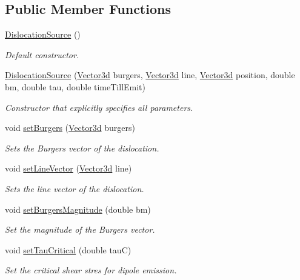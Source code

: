 \subsection*{\-Public \-Member \-Functions}
\begin{DoxyCompactItemize}
\item 
\hyperlink{classDislocationSource_afc9b7984d9486354b6f3d82033707577}{\-Dislocation\-Source} ()
\begin{DoxyCompactList}\small\item\em \-Default constructor. \end{DoxyCompactList}\item 
\hyperlink{classDislocationSource_a036a902d5e19a3f70371fa54f874d92e}{\-Dislocation\-Source} (\hyperlink{classVector3d}{\-Vector3d} burgers, \hyperlink{classVector3d}{\-Vector3d} line, \hyperlink{classVector3d}{\-Vector3d} position, double bm, double tau, double time\-Till\-Emit)
\begin{DoxyCompactList}\small\item\em \-Constructor that explicitly specifies all parameters. \end{DoxyCompactList}\item 
void \hyperlink{classDislocationSource_ae1a26d9f8149206b884436f44e92f4c3}{set\-Burgers} (\hyperlink{classVector3d}{\-Vector3d} burgers)
\begin{DoxyCompactList}\small\item\em \-Sets the \-Burgers vector of the dislocation. \end{DoxyCompactList}\item 
void \hyperlink{classDislocationSource_adf7d0b496f5935909daf071a0d733b17}{set\-Line\-Vector} (\hyperlink{classVector3d}{\-Vector3d} line)
\begin{DoxyCompactList}\small\item\em \-Sets the line vector of the dislocation. \end{DoxyCompactList}\item 
void \hyperlink{classDislocationSource_a41c1f953f9ad57a2b1a9b8d412980d91}{set\-Burgers\-Magnitude} (double bm)
\begin{DoxyCompactList}\small\item\em \-Set the magnitude of the \-Burgers vector. \end{DoxyCompactList}\item 
void \hyperlink{classDislocationSource_a3294cb807ec8dd0e1fa6ab6e51eeafa2}{set\-Tau\-Critical} (double tau\-C)
\begin{DoxyCompactList}\small\item\em \-Set the critical shear stres for dipole emission. \end{DoxyCompactList}\item 

\end{DoxyCompactItemize}
